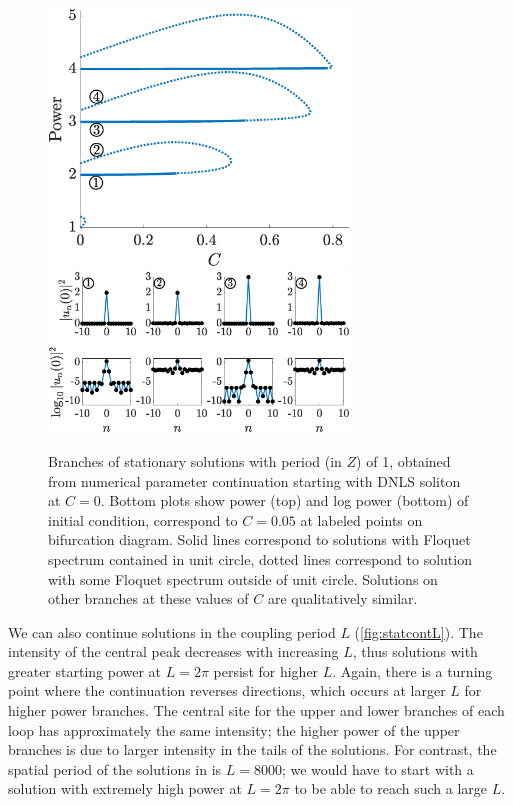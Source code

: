 \documentclass[reprint, amsmath,amssymb,aps,pre]{revtex4-2}
\begin{document}
\begin{figure}
    \centering
    \includegraphics[width=8cm]{stat1234AC.eps}
    \includegraphics[width=8cm]{stat1234ACsols.eps}
    \caption{Branches of stationary solutions with period (in $Z$) of 1, obtained from numerical parameter continuation starting with DNLS soliton at $C=0$. Bottom plots show power (top) and log power (bottom) of initial condition, correspond to $C=0.05$ at labeled points on bifurcation diagram. Solid lines correspond to solutions with Floquet spectrum contained in unit circle, dotted lines correspond to solution with some Floquet spectrum outside of unit circle. Solutions on other branches at these values of $C$ are qualitatively similar.}
    \label{fig:statAC}
\end{figure}

We can also continue solutions in the coupling period $L$ (\cref{fig:statcontL}). The intensity of the central peak decreases with increasing $L$, thus solutions with greater starting power at $L=2\pi$ persist for higher $L$. Again, there is a turning point where the continuation reverses directions, which occurs at larger $L$ for higher power branches. The central site for the upper and lower branches of each loop has approximately the same intensity; the higher power of the upper branches is due to larger intensity in the tails of the solutions. For contrast, the spatial period of the solutions in \cite[Figure 2]{Jurgensen2021} is $L=8000$; we would have to start with a solution with extremely high power at $L=2\pi$ to be able to reach such a large $L$.
\end{document}
